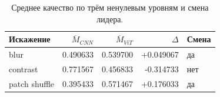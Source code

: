 \begin{table}[H]\centering\small
\setlength{\tabcolsep}{4pt}
\caption{Среднее качество по трём ненулевым уровням и смена лидера.}\label{tab:means}
\begin{tabular}{lrrrl}
\toprule
Искажение & $\overline M_{CNN}$ & $\overline M_{ViT}$ & $\Delta$ & Смена \\
\midrule
blur & 0.490633 & 0.539700 & +0.049067 & да \\
contrast & 0.771567 & 0.456833 & -0.314733 & нет \\
patch shuffle & 0.395433 & 0.571467 & +0.176033 & да \\
\bottomrule
\end{tabular}
\end{table}
